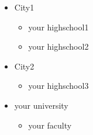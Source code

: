 \documentclass[english]{resume}
\date{\today}
\begin{document}
\maketitle

\lipsum[1]

	\begin{itemize}
		\item City1
			\begin{itemize}
				\item your highschool1 
				\item your highschool2 
			\end{itemize}
		\item City2
			\begin{itemize}
				\item your highschool3 
			\end{itemize}
	\end{itemize}
	\begin{itemize}
		\item your university
		\begin{itemize}
			\item your faculty 
		\end{itemize}
	\end{itemize}
	

\lipsum[1-2]
	
\end{document}
